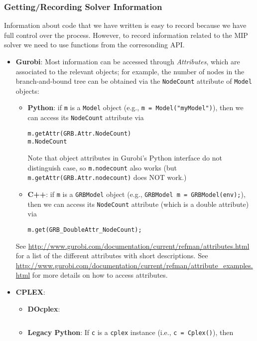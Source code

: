 \documentclass[12pt]{article}
\begin{document}
\subsubsection{Getting/Recording Solver Information}
Information about code that we have written is easy to record because we have full control over the process. However, to record information related to the MIP solver we need to use functions from the corresonding API.
\begin{itemize}
    \item \textbf{Gurobi}: Most information can be accessed through \emph{Attributes}, which are associated to the relevant objects; for example, the number of nodes in the branch-and-bound tree can be obtained via the \texttt{NodeCount} attribute of \texttt{Model} objects:
        \begin{itemize}
            \item \textbf{Python}: if \texttt{m} is a \texttt{Model} object (e.g., \texttt{m = Model("myModel")}), then we can access its \texttt{NodeCount} attribute via
\begin{verbatim}
m.getAttr(GRB.Attr.NodeCount)
m.NodeCount
\end{verbatim}
                Note that object attributes in Gurobi's Python interface do not distinguish case, so \texttt{m.nodecount} also works (but \texttt{m.getAttr(GRB.Attr.nodecount)} does NOT work.)
            \item \textbf{C++}: if \texttt{m} is a \texttt{GRBModel} object (e.g., \texttt{GRBModel m = GRBModel(env);}), then we can access its \texttt{NodeCount} attribute (which is a double attribute) via
\begin{verbatim}
m.get(GRB_DoubleAttr_NodeCount);
\end{verbatim}
        \end{itemize}
        See \url{http://www.gurobi.com/documentation/current/refman/attributes.html} for a list of the different attributes with short descriptions.  See \url{http://www.gurobi.com/documentation/current/refman/attribute_examples.html} for more details on how to access attributes.
    \item \textbf{CPLEX}:
        \begin{itemize}
            \item \textbf{DOcplex}:
\begin{verbatim}
\end{verbatim}
            \item \textbf{Legacy Python}:
                If \texttt{c} is a \texttt{cplex} instance (i.e., \texttt{c = Cplex()}), then

\end{itemize}
\end{itemize}
\end{document}
